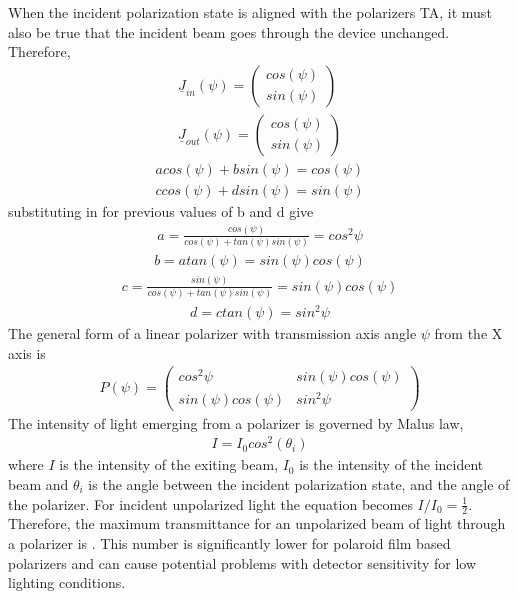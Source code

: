 %
When the incident polarization state is aligned with the polarizers TA, it must also be true that the incident beam goes through the device unchanged.  Therefore,
%
\begin{align}
    \underline{J}_{in}(\psi) =
    \begin{pmatrix}
        cos(\psi) \\
        sin(\psi)
    \end{pmatrix} \\
    \underline{J}_{out}(\psi) =
    \begin{pmatrix}
        cos(\psi) \\
        sin(\psi)
    \end{pmatrix}
\end{align}
\begin{align}
    acos(\psi) + bsin(\psi) = cos(\psi) \\
    ccos(\psi) + dsin(\psi) = sin(\psi)
\end{align}
%
substituting in for previous values of b and d give
%
\begin{align}
    a = \frac{cos(\psi)}{cos(\psi) + tan(\psi)sin(\psi)} = cos^2\psi
\end{align}
\begin{align}
    b = atan(\psi) = sin(\psi)cos(\psi)
\end{align}
\begin{align}
    c = \frac{sin(\psi)}{cos(\psi) + tan(\psi)sin(\psi)} = sin(\psi)cos(\psi)
\end{align}
\begin{align}
    d = ctan(\psi) = sin^2\psi
\end{align}
%
The general form of a linear polarizer with transmission axis angle $\psi$ from the X axis is
%
\begin{align}
    P(\psi) =
    \begin{pmatrix}
        cos^2\psi & sin(\psi)cos(\psi) \\
        sin(\psi)cos(\psi) & sin^2\psi
    \end{pmatrix}
\end{align}
%
The intensity of light emerging from a polarizer is governed by Malus law,
%
\begin{align}
    I = I_0cos^2(\theta_i)
\end{align}
%
where $I$ is the intensity of the exiting beam, $I_0$ is the intensity of the incident beam and $\theta_i$ is the angle between the incident polarization state, and the angle of the polarizer.   For incident unpolarized light the equation becomes $I / I_0 = \frac{1}{2}$.  Therefore, the maximum transmittance for an unpolarized beam of light through a polarizer is .  This number is significantly lower for polaroid film based polarizers and can cause potential problems with detector sensitivity for low lighting conditions.

